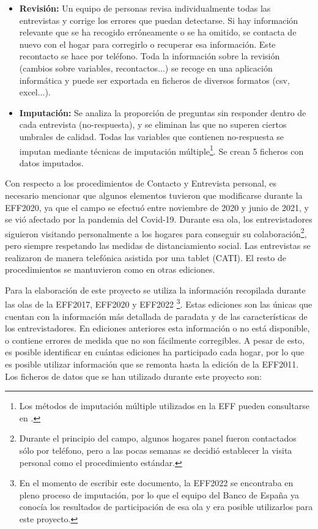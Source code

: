\begin{itemize}
    \item \textbf{Revisión:} Un equipo de personas revisa individualmente todas las entrevistas y corrige los errores que puedan detectarse. Si hay información relevante que se ha recogido erróneamente o se ha omitido, se contacta de nuevo con el hogar para corregirlo o recuperar esa información. Este recontacto se hace por teléfono. Toda la información sobre la revisión (cambios sobre variables, recontactos...) se recoge en una aplicación informática y puede ser exportada en ficheros de diversos formatos (csv, excel...).
    \item \textbf{Imputación:} Se analiza la proporción de preguntas sin responder dentro de cada entrevista (no-respuesta), y se eliminan las que no superen ciertos umbrales de calidad. Todas las variables que contienen no-respuesta se imputan mediante técnicas de imputación múltiple\footnote{Los métodos de imputación múltiple utilizados en la EFF pueden consultarse en \cite{barcelo2006imputation}.}. Se crean 5 ficheros con datos imputados.
\end{itemize}

Con respecto a los procedimientos de Contacto y Entrevista personal, es necesario mencionar que algunos elementos tuvieron que modificarse durante la EFF2020, ya que el campo se efectuó entre noviembre de 2020 y junio de 2021, y se vió afectado por la pandemia del Covid-19. Durante esa ola, los entrevistadores siguieron visitando personalmente a los hogares para conseguir su colaboración\footnote{Durante el principio del campo, algunos hogares panel fueron contactados sólo por teléfono, pero a las pocas semanas se decidió establecer la visita personal como el procedimiento estándar.}, pero siempre respetando las medidas de distanciamiento social. Las entrevistas se realizaron de manera telefónica asistida por una tablet (CATI). El resto de procedimientos se mantuvieron como en otras ediciones.

Para la elaboración de este proyecto se utiliza la información recopilada durante las olas de la EFF2017, EFF2020 y EFF2022 \footnote{En el momento de escribir este documento, la EFF2022 se encontraba en pleno proceso de imputación, por lo que el equipo del Banco de España ya conocía los resultados de participación de esa ola y era posible utilizarlos para este proyecto.}. Estas ediciones son las únicas que cuentan con la información más detallada de paradata y de las características de los entrevistadores. En ediciones anteriores esta información o no está disponible, o contiene errores de medida que no son fácilmente corregibles. A pesar de esto, es posible identificar en cuántas ediciones ha participado cada hogar, por lo que es posible utilizar información que se remonta hasta la edición de la EFF2011. Los ficheros de datos que se han utilizado durante este proyecto son:

